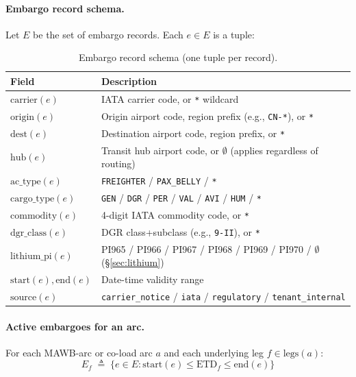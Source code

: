 \documentclass[11pt,a4paper]{article}
\newcommand{\defeq}{\triangleq}
\theoremstyle{definition}
\begin{document}
\paragraph{Embargo record schema.}
Let $E$ be the set of embargo records. Each $e \in E$ is a tuple:
\begin{table}[H]
\centering
\caption{Embargo record schema (one tuple per record).}
\label{tab:embargo-schema}
\begin{tabular}{lp{9cm}}
\toprule
Field & Description \\
\midrule
$\text{carrier}(e)$ & IATA carrier code, or \texttt{*} wildcard \\
$\text{origin}(e)$ & Origin airport code, region prefix (e.g., \texttt{CN-*}), or \texttt{*} \\
$\text{dest}(e)$ & Destination airport code, region prefix, or \texttt{*} \\
$\text{hub}(e)$ & Transit hub airport code, or $\emptyset$ (applies regardless of routing) \\
$\text{ac\_type}(e)$ & \texttt{FREIGHTER} / \texttt{PAX\_BELLY} / \texttt{*} \\
$\text{cargo\_type}(e)$ & \texttt{GEN} / \texttt{DGR} / \texttt{PER} / \texttt{VAL} / \texttt{AVI} / \texttt{HUM} / \texttt{*} \\
$\text{commodity}(e)$ & 4-digit IATA commodity code, or \texttt{*} \\
$\text{dgr\_class}(e)$ & DGR class+subclass (e.g., \texttt{9-II}), or \texttt{*} \\
$\text{lithium\_pi}(e)$ & PI965 / PI966 / PI967 / PI968 / PI969 / PI970 / $\emptyset$ (\S\ref{sec:lithium}) \\
$\text{start}(e), \text{end}(e)$ & Date-time validity range \\
$\text{source}(e)$ & \texttt{carrier\_notice} / \texttt{iata} / \texttt{regulatory} / \texttt{tenant\_internal} \\
\bottomrule
\end{tabular}
\end{table}

\paragraph{Active embargoes for an arc.}
For each MAWB-arc or co-load arc $a$ and each underlying leg $f \in
\text{legs}(a)$:
\begin{equation}
  E_f \;\defeq\; \{ e \in E : \text{start}(e) \leq \text{ETD}_f \leq \text{end}(e) \}
  \label{eq:active-embargoes}
\end{equation}
\end{document}
